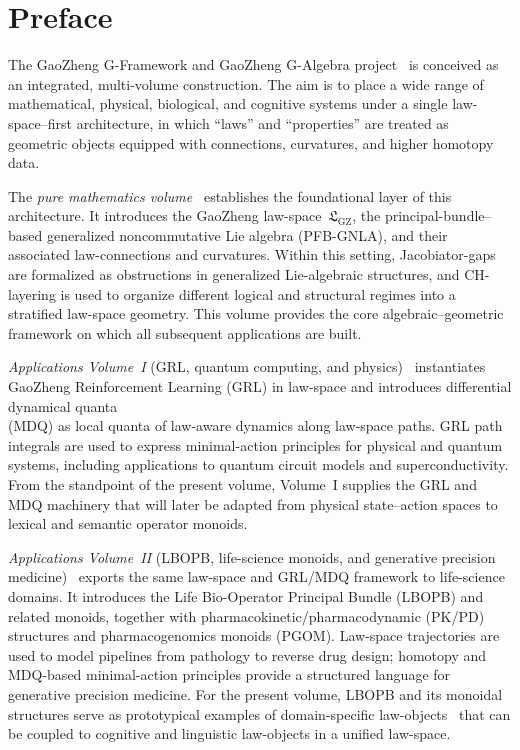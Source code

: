 \documentclass[11pt]{book}
\theoremstyle{plain}
\theoremstyle{definition}
\theoremstyle{remark}
\newcommand{\GZLS}{\ensuremath{\mathfrak{L}_{\mathrm{GZ}}}}       \newcommand{\GZLT}{\ensuremath{M_{!w}}}                           \newcommand{\GZLOC}{\ensuremath{A_M}}                             \newcommand{\GZLC}{\ensuremath{\omega_{\mathrm{law}}}}            \newcommand{\GZLCurv}{\ensuremath{\mathcal{F}_{\mathrm{law}}}}
\begin{document}
\chapter*{Preface}

The GaoZheng G-Framework and GaoZheng G-Algebra project~\cite{GaoZheng2025GFramework} is conceived as
an integrated, multi-volume construction. The aim is to place a wide
range of mathematical, physical, biological, and cognitive systems
under a single law-space–first architecture, in which ``laws'' and
``properties'' are treated as geometric objects equipped with
connections, curvatures, and higher homotopy data.

The \emph{pure mathematics volume}~\cite{GaoZheng2025GFramework} establishes the foundational layer of
this architecture. It introduces the GaoZheng law-space~$\GZLS$, the
principal-bundle–based generalized noncommutative Lie algebra
(PFB-GNLA), and their associated law-connections and curvatures. Within
this setting, Jacobiator-gaps are formalized as obstructions in
generalized Lie-algebraic structures, and CH-layering is used to
organize different logical and structural regimes into a stratified
law-space geometry. This volume provides the core algebraic–geometric
framework on which all subsequent applications are built.

\emph{Applications Volume~I} (GRL, quantum computing, and physics)~\cite{GaoZhengAppVol1}
instantiates GaoZheng Reinforcement Learning (GRL) in law-space and
introduces differential dynamical quanta \\(MDQ) as local quanta of
law-aware dynamics along law-space paths. GRL path integrals are used to
express minimal-action principles for physical and quantum systems,
including applications to quantum circuit models and superconductivity.
From the standpoint of the present volume, Volume~I supplies the GRL and
MDQ machinery that will later be adapted from physical state–action
spaces to lexical and semantic operator monoids.

\emph{Applications Volume~II} (LBOPB, life-science monoids, and
generative precision medicine)~\cite{GaoZhengAppVol2} exports the same law-space and GRL/MDQ
framework to life-science domains. It introduces the Life Bio-Operator
Principal Bundle (LBOPB) and related monoids, together with
pharmacokinetic/pharmacodynamic (PK/PD) structures and pharmacogenomics
monoids (PGOM). Law-space trajectories are used to model pipelines from
pathology to reverse drug design; homotopy and MDQ-based minimal-action
principles provide a structured language for generative precision
medicine. For the present volume, LBOPB and its monoidal structures
serve as prototypical examples of domain-specific law-objects~\cite{GaoZhengAppVol2} that can
be coupled to cognitive and linguistic law-objects in a unified
law-space.
\end{document}
